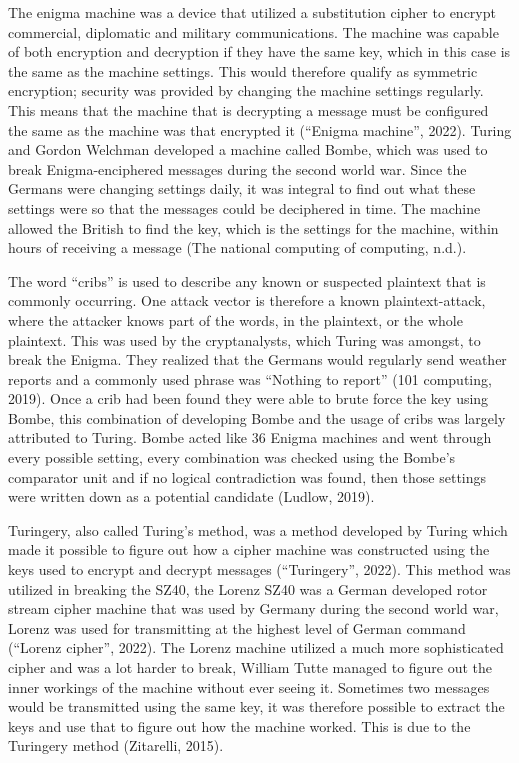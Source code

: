 \documentclass[11pt]{article}
\begin{document}
The enigma machine was a device that utilized a substitution cipher to
encrypt commercial, diplomatic and military communications. The machine
was capable of both encryption and decryption if they have the same key,
which in this case is the same as the machine settings. This would
therefore qualify as symmetric encryption; security was provided by
changing the machine settings regularly. This means that the machine
that is decrypting a message must be configured the same as the machine
was that encrypted it (``Enigma machine'', 2022). Turing and Gordon
Welchman developed a machine called Bombe, which was used to break
Enigma-enciphered messages during the second world war. Since the
Germans were changing settings daily, it was integral to find out what
these settings were so that the messages could be deciphered in time.
The machine allowed the British to find the key, which is the settings
for the machine, within hours of receiving a message (The national
computing of computing, n.d.).

The word ``cribs'' is used to describe any known or suspected plaintext
that is commonly occurring. One attack vector is therefore a known
plaintext-attack, where the attacker knows part of the words, in the
plaintext, or the whole plaintext. This was used by the cryptanalysts,
which Turing was amongst, to break the Enigma. They realized that the
Germans would regularly send weather reports and a commonly used phrase
was ``Nothing to report'' (101 computing, 2019). Once a crib had been
found they were able to brute force the key using Bombe, this
combination of developing Bombe and the usage of cribs was largely
attributed to Turing. Bombe acted like 36 Enigma machines and went
through every possible setting, every combination was checked using the
Bombe's comparator unit and if no logical contradiction was found, then
those settings were written down as a potential candidate (Ludlow,
2019).

Turingery, also called Turing's method, was a method developed by Turing
which made it possible to figure out how a cipher machine was
constructed using the keys used to encrypt and decrypt messages
(``Turingery'', 2022). This method was utilized in breaking the SZ40,
the Lorenz SZ40 was a German developed rotor stream cipher machine that
was used by Germany during the second world war, Lorenz was used for
transmitting at the highest level of German command (``Lorenz cipher'',
2022). The Lorenz machine utilized a much more sophisticated cipher and
was a lot harder to break, William Tutte managed to figure out the inner
workings of the machine without ever seeing it. Sometimes two messages
would be transmitted using the same key, it was therefore possible to
extract the keys and use that to figure out how the machine worked. This
is due to the Turingery method (Zitarelli, 2015).
\end{document}
